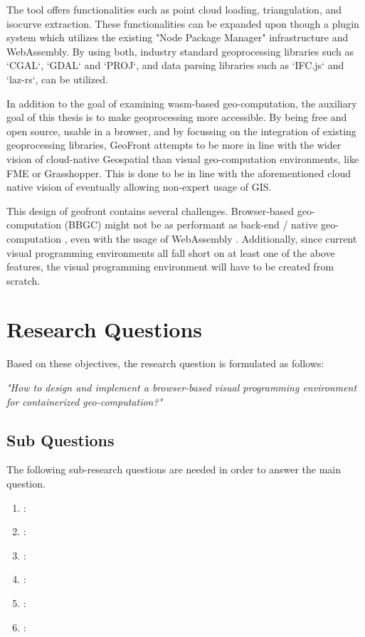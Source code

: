 The tool offers functionalities such as point cloud loading, triangulation, and isocurve extraction.
These functionalities can be expanded upon though a plugin system which utilizes the existing "Node Package Manager" infrastructure and WebAssembly.
By using both, industry standard geoprocessing libraries such as `CGAL`, `GDAL` and `PROJ`, and data parsing libraries such as `IFC.js` and `laz-rs`, can be utilized.

In addition to the goal of examining wasm-based geo-computation, the auxiliary goal of this thesis is to make geoprocessing more accessible. 
By being free and open source, usable in a browser, and by focussing on the integration of existing geoprocessing libraries, GeoFront attempts to be more in line with the wider vision of cloud-native Geospatial than visual geo-computation environments, like FME or Grasshopper. 
This is done to be in line with the aforementioned cloud native vision of eventually allowing non-expert usage of GIS.



This design of geofront contains several challenges. Browser-based geo-computation (BBGC) might not be as performant as back-end / native geo-computation \cite{panidi_hybrid_2015, hamilton_client-side_2014}, even with the usage of WebAssembly \cite{jangda_not_2019}. 
Additionally, since current visual programming environments all fall short on at least one of the above features, the visual programming environment will have to be created from scratch.

\newpage
\section{Research Questions}
Based on these objectives, the research question is formulated as follows: 

\textit{"How to design and implement a browser-based visual programming environment for containerized geo-computation?"}

\subsection*{Sub Questions}
The following sub-research questions are needed in order to answer the main question. 


\begin{enumerate}[a]
  \item {}: 
  \item {}: 
  \item {}: 
  \item {}: 
  \item {}:   
  \item {}:  
\end{enumerate}

